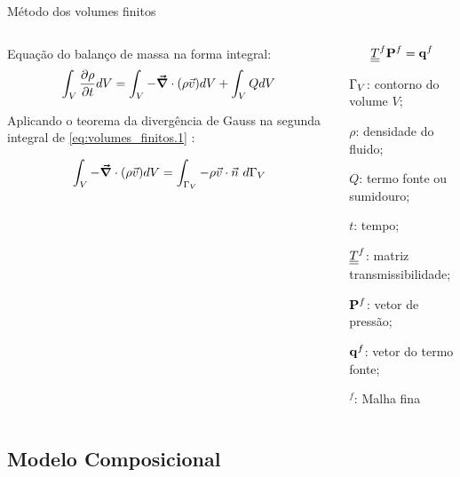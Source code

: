 \documentclass[professionalfont]{beamer}
\begin{document}
\begin{frame}{Método dos volumes finitos}

\begin{columns}
\begin{column}{0.6\textwidth}
Equação do balanço de massa na forma integral:
  \begin{equation}
	\label{eq:volumes_finitos.1}
	\int_{V} \frac{\partial \rho}{\partial t} dV = \int_{V} - \mbox{\boldmath$ \vec{\nabla} $} \cdot (\rho \vec{v}) dV + \int_{V} Q dV
\end{equation}

Aplicando o teorema da divergência de Gauss na segunda integral de \eqref{eq:volumes_finitos.1} \cite{Souza2015}:

 \begin{equation}
	 \label{eq:volumes_finitos.2}
	 \int_{V} - \mbox{\boldmath$ \vec{\nabla} $} \cdot (\rho \vec{v}) dV = \int_{\Gamma_{V}} - \rho \vec{v} \cdot \vec{n} \text{ } d \Gamma_{V}
 \end{equation}

\end{column}
\begin{column}{0.4\textwidth}  %
    \begin{equation}
        \underline{\underline{T}}^{f} \mathbf{P}^{f} = \mathbf{q}^{f}
    \end{equation}

    \begin{description}[]
        \small
        \item $\Gamma_{V}$: contorno do volume $V$;
        \item $\rho$: densidade do fluido;
        \item $Q$: termo fonte ou sumidouro;
        \item $t$: tempo;
        \item $\underline{\underline{T}}^{f}$: matriz transmissibilidade;
        \item $\mathbf{P}^{f}$: vetor de pressão;
        \item $\mathbf{q}^{f}$: vetor do termo fonte;
        \item $^{f}$: Malha fina
    \end{description}
    
\end{column}
\end{columns}

\end{frame}



\subsection{Modelo Composicional}
\end{document}
